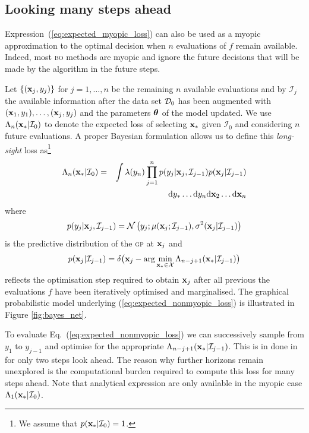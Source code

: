 \documentclass[twoside]{article}
\newcommand{\I}{\mathcal{I}}
\newcommand{\ud}{\mathrm{d}}
\newcommand{\acr}[1]{\textsc{#1}\xspace}
\newcommand{\gp}{\acr{gp}}
\newcommand{\bo}{\acr{bo}}
\begin{document}
\subsection{Looking many steps ahead}
Expression~(\ref{eq:expected_myopic_loss}) can also be used as a myopic approximation to the optimal decision when $n$ evaluations of $f$ remain available. Indeed, most \bo methods are myopic and ignore the future decisions that will be made by the algorithm in the future steps. 

Let $\{(\mathbf{x}_j,y_j)\}$ for $j=1,\dots,n$ be the remaining $n$ available evaluations and by $\I_j$ the available information after the data set $\mathcal{D}_0$ has been augmented with $(\mathbf{x}_1,y_1),\dots,(\mathbf{x}_j,y_j)$ and the parameters $\boldsymbol{\theta}$ of the model updated. We use $\Lambda_n(\latentVector_*|\I_0 )$ to denote the expected loss of selecting $\mathbf{x}_*$ given $\I_0$ and  considering $n$ future evaluations.  A proper Bayesian formulation allows us to define this \emph{long-sight} loss  \citep{osborne_bayesian_2010}  as\footnote{We assume that $p(\latentVector_*|\I_0)=1$.}
\begin{eqnarray}\nonumber
\Lambda_n(\latentVector_*|\I_0 ) &= & \int \lambda(y_n) \prod_{j=1}^{n}p(y_{j}|\latentVector_{j},\I_{j-1}) p(\latentVector_{j}|\I_{j-1})\\\label{eq:expected_nonmyopic_loss}
& & \ud y_*\dots \ud y_n \ud\latentVector_2\dots \ud\latentVector_n
\end{eqnarray}
where 
$$p(y_{j}|\latentVector_{j},\I_{j-1})= \mathcal{N} \left(y_{j};\mu(\latentVector_{j};\I_{j-1}),\sigma^2(\latentVector_{j}|\I_{j-1} ) \right)$$ 
is the predictive distribution of the \gp at $\mathbf{x}_{j}$  and 
$$p(\latentVector_{j}|\I_{j-1}) = \delta \bigr(\latentVector_{j} - \arg \min_{\latentVector_* \in {\mathcal X}} \Lambda_{n-j+1}(\latentVector_*|\I_{j-1})\bigl)$$ 
reflects the optimisation step required to obtain $\mathbf{x}_{j}$ after all previous the evaluations $f$ have been iteratively optimised and marginalised.  The graphical probabilistic model underlying (\ref{eq:expected_nonmyopic_loss}) is illustrated in Figure \ref{fig:bayes_net}.

To evaluate Eq.~(\ref{eq:expected_nonmyopic_loss}) we can successively sample from $y_1$ to $y_{j-1}$ and optimise for the appropriate $\Lambda_{n-j+1}(\latentVector_*|\I_{j-1})$. This is in done in \citep{osborne_bayesian_2010} for only two steps look ahead. The reason why further horizons remain unexplored is the  computational burden required to compute this loss for many steps ahead. Note that analytical expression are only available in the myopic case $\Lambda_1(\latentVector_*| \I_0)$.
\end{document}
